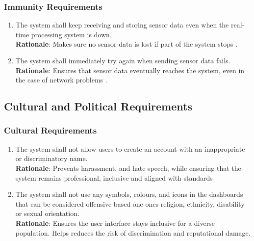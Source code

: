\documentclass[]{article}
\begin{document}
\subsubsection{Immunity Requirements}
\label{ssub:immunity_requirements}
\begin{enumerate}[{SR-IM}1. ]
	\item The system shall keep receiving and storing sensor data even when the real-time processing system is down. \\
    \textbf{Rationale}: Makes sure no sensor data is lost if part of the system stops \cite{canRead}.

    \item The system shall immediately try again when sending sensor data fails.\\
    \textbf{Rationale}: Ensures that sensor data eventually reaches the system, even in the case of network problems \cite{canRead}.
\end{enumerate}


\subsection{Cultural and Political Requirements}
\label{sub:cultural_and_political_requirements}

\subsubsection{Cultural Requirements}
\label{ssub:cultural_requirements}
\begin{enumerate}[{CP-C}1. ]
	\item The system shall not allow users to create an account with an inappropriate or discriminatory name. \\
    \textbf{Rationale}: Prevents harassment, and hate speech, while ensuring that the system remains professional, inclusive and aligned with standards

    \item The system shall not use any symbols, colours, and icons in the dashboards that can be considered offensive based one ones religion, ethnicity, disability or sexual orientation.  \\
    \textbf{Rationale}: Ensures the user interface stays inclusive for a diverse population. Helps reduces the risk of discrimination and reputational damage.
\end{enumerate}
\end{document}
